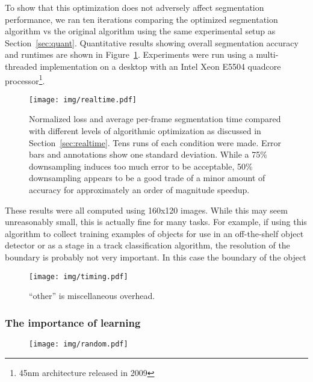 \documentclass[graybox]{svmult}
\begin{document}
To show that this optimization does not adversely affect segmentation performance, we ran ten iterations comparing the optimized segmentation algorithm vs the original algorithm using the same experimental setup as Section~\ref{sec:quant}.  Quantitative results showing overall segmentation accuracy and runtimes are shown in Figure~\ref{fig:realtime}. Experiments were run using a multi-threaded implementation on a desktop with an Intel Xeon E5504 quadcore processor\footnote{45nm architecture released in 2009}.  

\begin{figure}
  \centering
  \texttt{[image: img/realtime.pdf]}
  \caption{Normalized loss and average per-frame segmentation time compared with different levels of algorithmic optimization as discussed in Section~\ref{sec:realtime}.  Tens runs of each condition were made.  Error bars and annotations show one standard deviation.  While a 75\% downsampling induces too much error to be acceptable, 50\% downsampling appears to be a good trade of a minor amount of accuracy for approximately an order of magnitude speedup.}
  \label{fig:realtime}
\end{figure}

These results were all computed using 160x120 images.  While this may seem unreasonably small, this is actually fine for many tasks.  For example, if using this algorithm to collect training examples of objects for use in an off-the-shelf object detector or as a stage in a track classification algorithm, the resolution of the boundary is probably not very important.  In this case the boundary of the object 


\begin{figure}
  \centering
  \texttt{[image: img/timing.pdf]}
  \caption{``other'' is miscellaneous overhead.}
  \label{fig:timing}
\end{figure}


\subsubsection{The importance of learning}

\begin{figure}
  \centering
  \texttt{[image: img/random.pdf]}
  \caption{}
  \label{fig:timing}
\end{figure}
\end{document}
